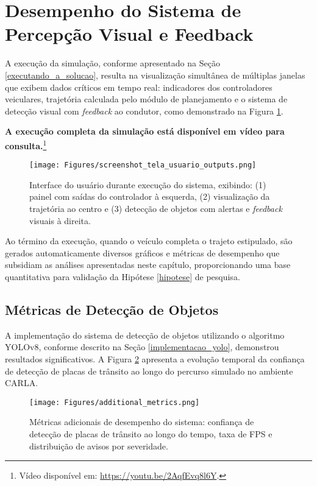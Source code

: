 \section{Desempenho do Sistema de Percepção Visual e Feedback} \label{sec:desempenho_percep}

A execução da simulação, conforme apresentado na Seção \ref{executando_a_solucao}, resulta na visualização simultânea de múltiplas janelas que exibem dados críticos em tempo real: indicadores dos controladores veiculares, trajetória calculada pelo módulo de planejamento e o sistema de detecção visual com \textit{feedback} ao condutor, como demonstrado na Figura \ref{fig:screenshot}.

\textbf{A execução completa da simulação está disponível em vídeo para consulta.}\footnote{Vídeo disponível em: \url{https://youtu.be/2AqfEvq8l6Y}.}



\begin{figure}[H]
\centering
\texttt{[image: Figures/screenshot\_tela\_usuario\_outputs.png]}
\caption{Interface do usuário durante execução do sistema, exibindo: (1) painel com saídas do controlador à esquerda, (2) visualização da trajetória ao centro e (3) detecção de objetos com alertas e \textit{feedback} visuais à direita.}
\label{fig:screenshot}
\end{figure}

Ao término da execução, quando o veículo completa o trajeto estipulado, são gerados automaticamente diversos gráficos e métricas de desempenho que subsidiam as análises apresentadas neste capítulo, proporcionando uma base quantitativa para validação da Hipótese \ref{hipotese} de pesquisa.

\subsection{Métricas de Detecção de Objetos} \label{subsec:metricas_deteccao}

A implementação do sistema de detecção de objetos utilizando o algoritmo YOLOv8, conforme descrito na Seção \ref{implementacao_yolo}, demonstrou resultados significativos. A Figura \ref{fig:confianca_deteccao} apresenta a evolução temporal da confiança de detecção de placas de trânsito ao longo do percurso simulado no ambiente CARLA.

\begin{figure}[H]
\centering
\texttt{[image: Figures/additional\_metrics.png]}
\caption{Métricas adicionais de desempenho do sistema: confiança de detecção de placas de trânsito ao longo do tempo, taxa de FPS e distribuição de avisos por severidade.}
\label{fig:confianca_deteccao}
\end{figure}

